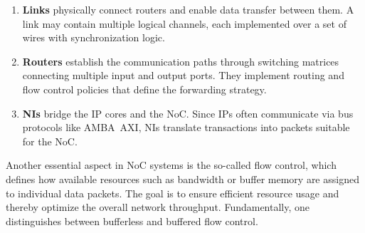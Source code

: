 \begin{enumerate}
    \item \textbf{Links} physically connect routers and enable data transfer between them. A link may contain multiple logical channels, each implemented over a set of wires with synchronization logic.
    \item \textbf{Routers} establish the communication paths through switching matrices connecting multiple input and output ports. They implement routing and flow control policies that define the forwarding strategy.
    \item \textbf{\acp{NI}} bridge the IP cores and the NoC. Since IPs often communicate via bus protocols like AMBA~AXI, \acp{NI} translate transactions into packets suitable for the NoC.
\end{enumerate}

\iffalse
{} 
Another essential aspect in \ac{NoC} systems is the so-called flow control, which defines how available resources such as bandwidth or buffer memory are assigned to individual data packets. The goal is to ensure efficient resource usage and thereby optimize the overall network throughput. Fundamentally, one distinguishes between bufferless and buffered flow control.

